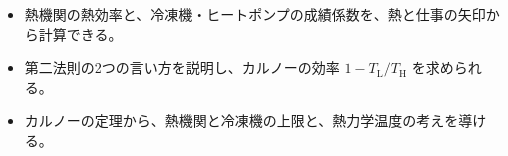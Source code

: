 \makeatletter
\newcommand\qxfres[4]{\node[draw=#4!70!black, fill=#4!14, line width=0.7pt, rounded corners=1.2mm, minimum width=#2 mm, minimum height=7mm, font=\sffamily\footnotesize, inner sep=1pt] at #1 {#3};}
\newcommand\qxfmach[3]{\node[draw=bkInk, fill=white, line width=0.8pt, rounded corners=2.5mm, minimum width=19mm, minimum height=8mm, font=\sffamily\footnotesize\bfseries, inner xsep=2.2mm, inner ysep=1pt] (#1) at #2 {#3};}
\makeatother
{}


\begin{goal}
\begin{itemize}[label={\color{bkTheme}●}, leftmargin=1.6\zw, itemsep=0pt, topsep=1pt]
\item {}\enspace 熱機関の熱効率と、冷凍機・ヒートポンプの成績係数を、熱と仕事の矢印から計算できる。
\item {}\enspace 第二法則の2つの言い方を説明し、カルノーの効率 $1-T_{\mathrm L}/T_{\mathrm H}$ を求められる。
\item {}\enspace カルノーの定理から、熱機関と冷凍機の上限と、熱力学温度の考えを導ける。
\end{itemize}
\end{goal}

